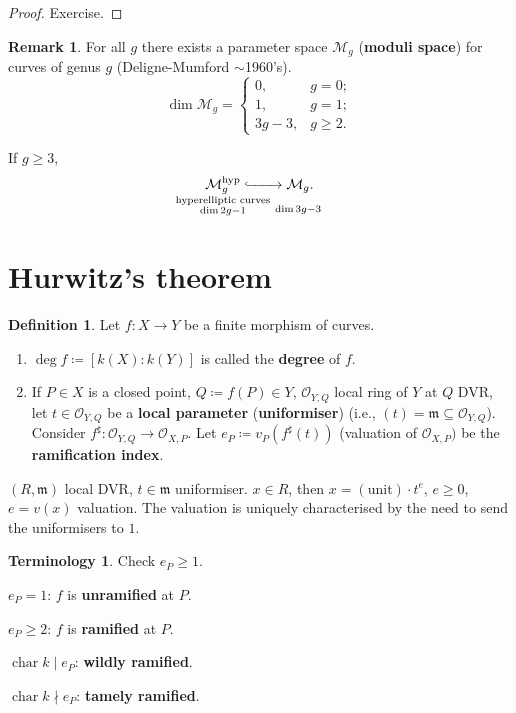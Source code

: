 \documentclass[12pt]{article}
\DeclareMathOperator{\chara}{char}
\theoremstyle{definition}
\newtheorem*{definition}{Definition}
\newtheorem*{remark}{Remark}
\newtheorem*{terminology}{Terminology}
\begin{document}
\begin{proof}
Exercise.
\end{proof}

\begin{remark}
For all $g$ there exists a parameter space $\mathcal M_g$ (\textbf{moduli space}) for curves of genus $g$ (Deligne-Mumford $\sim$1960's).
\[\dim\mathcal M_g=\left\{\begin{array}{ll}0,&g=0;\\1,&g=1;\\3g-3,&g\geq2.\end{array}\right.\]

If $g\geq3$,
\[{\vphantom{\mathcal M_g^\text{hyp}}}\underset{\mathclap{\substack{\text{hyperelliptic curves}\\\dim2g-1}}}{\mathcal M_g^\text{hyp}}\lhook\joinrel\xrightarrow{\hspace{7mm}}\underset{\mathclap{\substack{\vphantom{hyplt}\\\dim3g-3}}}{\mathcal M_g}.\]
\end{remark}

\section{Hurwitz's theorem}
\begin{definition}
Let $f:X\rightarrow Y$ be a finite morphism of curves.

\begin{enumerate}[label=\arabic*)]
\item $\deg f\coloneqq[k(X):k(Y)]$ is called the \textbf{degree} of $f$.

\item If $P\in X$ is a closed point, $Q\coloneqq f(P)\in Y$, $\mathcal O_{Y,Q}$ local ring of $Y$ at $Q$ DVR, let $t\in\mathcal O_{Y,Q}$ be a \textbf{local parameter} (\textbf{uniformiser}) (i.e., $(t)=\mathfrak m\subseteq\mathcal O_{Y,Q}$). Consider $f^\sharp:\mathcal O_{Y,Q}\rightarrow\mathcal O_{X,P}$. Let $e_P\coloneqq v_P(f^\sharp(t))$ (valuation of $\mathcal O_{X,P})$ be the \textbf{ramification index}.
\end{enumerate}
\end{definition}

$(R,\mathfrak m)$ local DVR, $t\in \mathfrak m$ uniformiser. $x\in R$, then $x=(\text{unit})\cdot t^e$, $e\geq0$, $e=v(x)$ valuation. The valuation is uniquely characterised by the need to send the uniformisers to $1$.

\begin{terminology}
Check $e_P\geq1$.

$e_P=1$: $f$ is \textbf{unramified} at $P$.

$e_P\geq2$: $f$ is \textbf{ramified} at $P$.

$\chara k\mid e_P$: \textbf{wildly ramified}.

$\chara k\nmid e_P$: \textbf{tamely ramified}.
\end{terminology}
\end{document}
